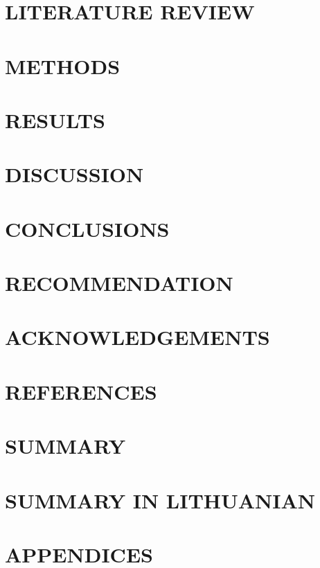 \documentclass[11pt]{report}
\begin{document}
\chapter{LITERATURE REVIEW}


\chapter{METHODS}


\chapter{RESULTS}


\chapter{DISCUSSION}

\chapter{CONCLUSIONS}

\chapter{RECOMMENDATION}

\chapter{ACKNOWLEDGEMENTS}

\chapter{REFERENCES}
\printbibliography[heading=none]

\chapter{SUMMARY}

\chapter{SUMMARY IN LITHUANIAN}

\chapter{APPENDICES}
\end{document}
